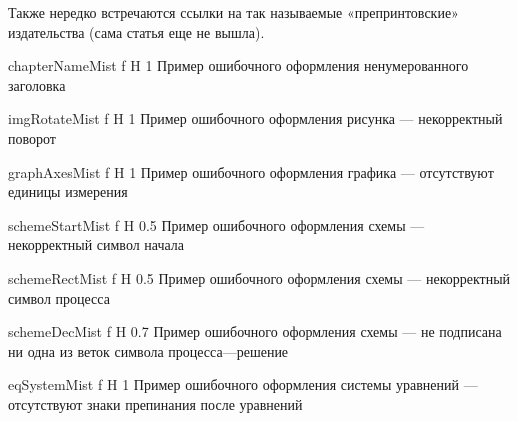 Также нередко встречаются ссылки на так называемые «препринтовские» издательства (сама статья еще не вышла).

{chapterNameMist} %
{f} %
{H} %
{1\textwidth} %
{Пример ошибочного оформления ненумерованного заголовка} %

{imgRotateMist} %
{f} %
{H} %
{1\textwidth} %
{Пример ошибочного оформления рисунка --- некорректный поворот} %

{graphAxesMist} %
{f} %
{H} %
{1\textwidth} %
{Пример ошибочного оформления графика --- отсутствуют единицы измерения} %

{schemeStartMist} %
{f} %
{H} %
{0.5\textwidth} %
{Пример ошибочного оформления схемы --- некорректный символ начала} %

{schemeRectMist} %
{f} %
{H} %
{0.5\textwidth} %
{Пример ошибочного оформления схемы --- некорректный символ процесса} %

{schemeDecMist} %
{f} %
{H} %
{0.7\textwidth} %
{Пример ошибочного оформления схемы --- не подписана ни одна из веток символа процесса---решение} %

{eqSystemMist} %
{f} %
{H} %
{1\textwidth} %
{Пример ошибочного оформления системы уравнений --- отсутствуют знаки препинания после уравнений} %

